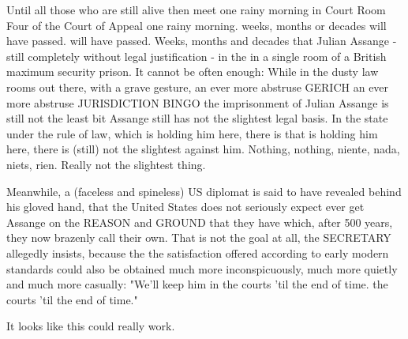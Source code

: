 \begin{multicols}{2}
Until all those who are still alive then meet one rainy morning in Court Room Four of the Court of
Appeal one rainy morning. weeks, months or decades will have passed. will have passed. Weeks,
months and decades that Julian Assange - still completely without legal justification - in the in a
single room of a British maximum security prison. It cannot be often enough: While in the dusty law
rooms out there, with a grave gesture, an ever more abstruse GERICH an ever more abstruse
JURISDICTION BINGO the imprisonment of Julian Assange is still not the least bit Assange still has
not the slightest legal basis. In the state under the rule of law, which is holding him here, there
is that is holding him here, there is (still) not the slightest against him. Nothing, nothing,
niente, nada, niets, rien. Really not the slightest thing.

Meanwhile, a (faceless and spineless) US diplomat is said to have revealed behind his gloved hand,
that the United States does not seriously expect ever get Assange on the REASON and GROUND that
they have which, after 500 years, they now brazenly call their own. That is not the goal at all,
the SECRETARY allegedly insists, because the the satisfaction offered according to early modern
standards could also be obtained much more inconspicuously, much more quietly and much more
casually: "We'll keep him in the courts 'til the end of time. the courts 'til the end of time."

It looks like this could really work.





\end{multicols}
